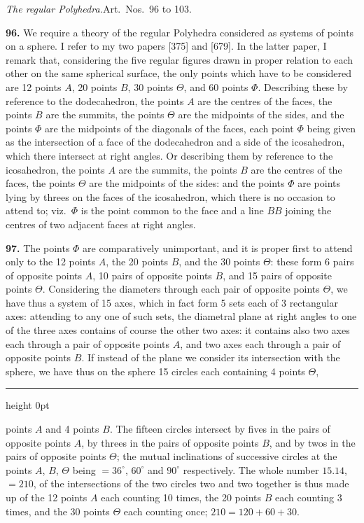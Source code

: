 \documentclass[11pt,a4paper]{article}
\newcommand{\artno}[1]{\textbf{#1.}\quad}
\begin{document}
\begin{center}
\textit{The regular Polyhedra.}\quad Art.\ Nos.\ 96 to 103.
\end{center}

\artno{96} We require a theory of the regular Polyhedra considered as
systems of points on a sphere. I refer to my two papers [375] and [679]. In
the latter paper, I remark that, considering the five regular figures drawn
in proper relation to each other on the same spherical surface, the only
points which have to be considered are 12 points $A$, 20 points $B$, 30
points $\Theta$, and 60 points $\Phi$. Describing these by reference to the
dodecahedron, the points $A$ are the centres of the faces, the points $B$
are the summits, the points $\Theta$ are the midpoints of the sides, and the
points $\Phi$ are the midpoints of the diagonals of the faces, each point
$\Phi$ being given as the intersection of a face of the dodecahedron and a
side of the icosahedron, which there intersect at right angles. Or
describing them by reference to the icosahedron, the points $A$ are the
summits, the points $B$ are the centres of the faces, the points $\Theta$
are the midpoints of the sides: and the points $\Phi$ are points lying by
threes on the faces of the icosahedron, which there is no occasion to
attend to; viz.\ $\Phi$ is the point common to the face and a line $BB$
joining the centres of two adjacent faces at right angles.

\artno{97} The points $\Phi$ are comparatively unimportant, and it is
proper first to attend only to the 12 points $A$, the 20 points $B$, and the
30 points $\Theta$: these form 6 pairs of opposite points $A$, 10 pairs of
opposite points $B$, and 15 pairs of opposite points $\Theta$. Considering
the diameters through each pair of opposite points $\Theta$, we have thus a
system of 15 axes, which in fact form 5 sets each of 3 rectangular axes:
attending to any one of such sets, the diametral plane at right angles to
one of the three axes contains of course the other two axes: it contains
also two axes each through a pair of opposite points $A$, and two axes each
through a pair of opposite points $B$. If instead of the plane we consider
its intersection with the sphere, we have thus on the sphere 15 circles
each containing 4 points $\Theta$,

\bigskip
\hrule height 0pt
\bigskip

 points $A$ and 4 points $B$. The fifteen circles intersect by fives in the
pairs of opposite points $A$, by threes in the pairs of opposite points $B$,
and by twos in the pairs of opposite points $\Theta$; the mutual
inclinations of successive circles at the points $A$, $B$, $\Theta$ being
$=36^{\circ}$, $60^{\circ}$ and $90^{\circ}$ respectively. The whole number
$15.14$, $=210$, of the intersections of the two circles two and two
together is thus made up of the 12 points $A$ each counting 10 times, the 20
points $B$ each counting 3 times, and the 30 points $\Theta$ each counting
once; $210 = 120 + 60 + 30$.
\end{document}
